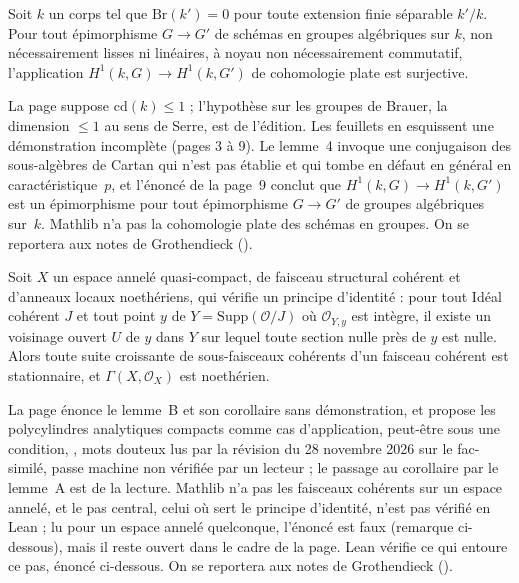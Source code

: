 \begin{encadre}
\begin{theoreme*}\nonverifie
Soit $k$ un corps tel que $\mathrm{Br}(k') = 0$ pour toute extension finie séparable $k'/k$. Pour tout épimorphisme $G \to G'$ de schémas en groupes algébriques sur $k$, non nécessairement lisses ni linéaires, à noyau non nécessairement commutatif, l'application $H^1(k, G) \to H^1(k, G')$ de cohomologie plate est surjective.
\end{theoreme*}
\end{encadre}
{\small La page suppose $\mathrm{cd}(k) \leq 1$ ; l'hypothèse sur les groupes de Brauer, la dimension $\leq 1$ au sens de Serre, est de l'édition. Les feuillets en esquissent une démonstration incomplète (pages 3 à 9). Le lemme~4 invoque une conjugaison des sous-algèbres de Cartan qui n'est pas établie et qui tombe en défaut en général en caractéristique~$p$, et l'énoncé de la page~9 conclut que $H^1(k,G) \to H^1(k,G')$ est un épimorphisme pour tout épimorphisme $G \to G'$ de groupes algébriques sur~$k$. Mathlib n'a pas la cohomologie plate des schémas en groupes. On se reportera aux notes de Grothendieck ().\par}

\begin{encadre}
\begin{theoreme*}\nonverifie
Soit $X$ un espace annelé quasi-compact, de faisceau structural cohérent et d'anneaux locaux noethériens, qui vérifie un principe d'identité : pour tout Idéal cohérent $J$ et tout point $y$ de $Y = \mathrm{Supp}(\mathcal O/J)$ où $\mathcal O_{Y,y}$ est intègre, il existe un voisinage ouvert $U$ de $y$ dans $Y$ sur lequel toute section nulle près de $y$ est nulle. Alors toute suite croissante de sous-faisceaux cohérents d'un faisceau cohérent est stationnaire, et $\Gamma(X, \mathcal O_X)$ est noethérien.
\end{theoreme*}
\end{encadre}
{\small La page énonce le lemme~B et son corollaire sans démonstration, et propose les polycylindres analytiques compacts comme cas d'application, peut-être sous une condition, , mots douteux lus par la révision du 28 novembre 2026 sur le fac-similé, passe machine non vérifiée par un lecteur ; le passage au corollaire par le lemme~A est de la lecture. Mathlib n'a pas les faisceaux cohérents sur un espace annelé, et le pas central, celui où sert le principe d'identité, n'est pas vérifié en Lean ; lu pour un espace annelé quelconque, l'énoncé est faux (remarque ci-dessous), mais il reste ouvert dans le cadre de la page. Lean vérifie ce qui entoure ce pas, énoncé ci-dessous. On se reportera aux notes de Grothendieck ().\par}

